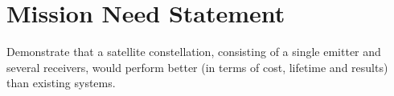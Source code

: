 \section{Mission Need Statement}
\label{dsePPMNS}
Demonstrate that a satellite constellation, consisting of a single emitter and several receivers, would perform better (in terms of cost, lifetime and results) than existing systems.